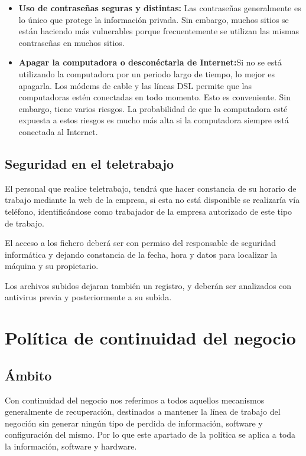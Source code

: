 \documentclass[11pt,bibtotoc,noliststotoc,BCOR0mm]{scrbook}
\begin{document}
\begin{itemize}
\item \textbf{Uso de contraseñas seguras y distintas:} Las contraseñas generalmente es lo único que protege la información privada. Sin embargo, muchos sitios se están haciendo más vulnerables porque frecuentemente se utilizan las mismas contraseñas en muchos sitios.
\item \textbf{Apagar la computadora o desconéctarla de Internet:}Si no se está utilizando la computadora por un periodo largo de tiempo, lo mejor es apagarla. Los módems de cable y las líneas DSL permite que las computadoras estén conectadas en todo momento. Esto es conveniente. Sin embargo, tiene varios riesgos. La probabilidad de que la computadora esté expuesta a estos riesgos es mucho más alta si la computadora siempre está conectada al Internet.
\end{itemize}

\section{Seguridad en el teletrabajo}

El personal que realice teletrabajo, tendrá que hacer constancia de su horario de trabajo mediante la web de la empresa, si  esta no está disponible se realizaría vía teléfono, identificándose como trabajador de la empresa autorizado de este tipo de trabajo.  

El acceso a los fichero deberá ser con permiso del responsable de seguridad informática y dejando constancia de la fecha, hora y datos para localizar la máquina y su propietario. 

Los archivos subidos dejaran también un registro, y deberán ser analizados con antivirus previa y posteriormente a su subida. 



\chapter{Política de continuidad del negocio}


\section{Ámbito}

Con continuidad del negocio nos referimos a todos aquellos mecanismos generalmente de recuperación, destinados a mantener la línea de trabajo del negoción sin generar ningún tipo de perdida de información, software y configuración del mismo. Por lo que este apartado de la política se aplica a toda la información, software y hardware.
\end{document}
